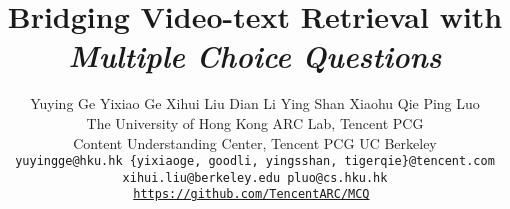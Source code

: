 \documentclass[10pt,twocolumn,letterpaper]{article}
\begin{document}
\title{Bridging Video-text Retrieval with \emph{Multiple Choice Questions}}
	
	\author{Yuying Ge \quad
		Yixiao Ge \quad
		Xihui Liu \quad
		Dian Li \quad
		Ying Shan \quad
		Xiaohu Qie \quad
		Ping Luo \quad\\
		{The University of Hong Kong} \quad 
		{ARC Lab, Tencent PCG}  \quad\\
		{Content Understanding Center, Tencent PCG}  \quad
		{UC Berkeley}\\
		\tt\small{yuyingge@hku.hk \quad \{yixiaoge, goodli, yingsshan, tigerqie\}@tencent.com}\\
		\tt\small{xihui.liu@berkeley.edu \quad pluo@cs.hku.hk}\\
		\vspace{5pt}
		{\small \url{https://github.com/TencentARC/MCQ}}
	}
	
\end{document}
